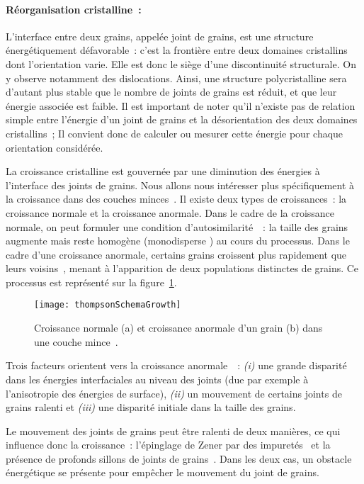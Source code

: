 \paragraph*{Réorganisation cristalline~:} L'interface entre deux grains, appelée joint de grains, est une structure énergétiquement défavorable~: c'est la frontière entre deux domaines cristallins dont l'orientation varie. Elle est donc le siège d'une discontinuité structurale. On y observe notamment des dislocations. Ainsi, une structure polycristalline sera d'autant plus stable que le nombre de joints de grains est réduit, et que leur énergie associée est faible. Il est important de noter qu'il n'existe pas de relation simple entre l'énergie d'un joint de grains et la désorientation des deux domaines cristallins~\cite{hull2001introduction}; Il convient donc de calculer ou mesurer cette énergie pour chaque orientation considérée.\par 
La croissance cristalline est gouvernée par une diminution des énergies à l'interface des joints de grains. Nous allons nous intéresser plus spécifiquement à la croissance dans des couches minces~\cite{thompson1990grain}. Il existe deux types de croissances~: la croissance normale et la croissance anormale. Dans le cadre de la croissance normale, on peut formuler une condition d'autosimilarité~\cite{mullins1986statistical}~: la taille des grains augmente mais reste homogène (\og monodisperse \fg) au cours du processus. Dans le cadre d'une croissance anormale, certains grains croissent plus rapidement que leurs voisins~\cite{thompson1990grain}, menant à l'apparition de deux populations distinctes de grains. Ce processus est représenté sur la figure~\ref{thompsonSchemaGrowth}.\par 
\begin{figure}[!htb]
\centering
\texttt{[image: thompsonSchemaGrowth]}
\caption{Croissance normale (a) et croissance anormale d'un grain (b) dans une couche mince~\cite{thompson1990grain}.}
\label{thompsonSchemaGrowth}
\end{figure}
Trois facteurs orientent vers la croissance anormale~\cite{hillert1965theory}~: \textit{(i)} une grande disparité dans les énergies interfaciales au niveau des joints (due par exemple à l'anisotropie des énergies de surface), \textit{(ii)} un mouvement de certains joints de grains ralenti et \textit{(iii)} une disparité initiale dans la taille des grains.\par 
Le mouvement des joints de grains peut être ralenti de deux manières, ce qui influence donc la croissance~: l'épinglage de Zener par des impuretés~\cite{couturier20053d} et la présence de profonds sillons de joints de grains~\cite{mullins1958effect}. Dans les deux cas, un obstacle énergétique se présente pour empêcher le mouvement du joint de grains.\par

